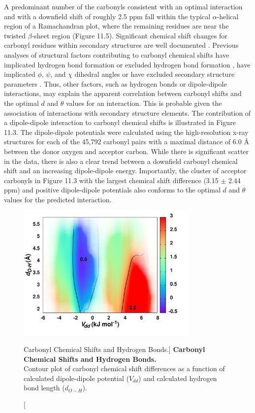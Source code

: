 \begin{doublespace}
A predominant number of the carbonyls consistent with an optimal \npistar{}
interaction and with a downfield shift of roughly 2.5 ppm fall within the
typical $\alpha$-helical region of a Ramachandran plot, where the remaining
residues are near the twisted $\beta$-sheet region (Figure 11.5). Significant
chemical shift changes for carbonyl residues within
secondary structures are well documented \cite{wang:protsci2002}.
Previous analyses of structural factors contributing to carbonyl \cnmr{}
chemical shifts have implicated hydrogen bond formation
\cite{dedios:sci1993,asakawa:jacs1992,wylie:jacs2007}
or excluded hydrogen bond formation
\cite{cisnetti:cpc2004,neal:jbnmr2003,markwick:jacs2004}, have
implicated $\phi$, $\psi$, and $\chi$ dihedral angles
\cite{neal:jbnmr2003} or have excluded secondary structure parameters
\cite{cisnetti:cpc2004,dedios:sci1993}. Thus, other factors,
such as hydrogen bonds or dipole-dipole interactions, may explain the apparent
correlation between carbonyl \cnmr{} shifts and the optimal $d$ and $\theta$
values for an \npistar{} interaction. This is probable given the association of
\npistar{} interactions with secondary structure elements. The contribution of
a dipole-dipole interaction to carbonyl \cnmr{} chemical shifts is illustrated
in Figure 11.3. The dipole-dipole potentials were calculated using the
high-resolution x-ray structures for each of the 45,792 carbonyl pairs with a
maximal distance of 6.0 \r{A} between the donor oxygen and acceptor carbon.
While there is significant scatter in the data, there is also a clear trend
between a downfield carbonyl \cnmr{} chemical shift and an increasing
dipole-dipole energy. Importantly, the cluster of acceptor carbonyls in
Figure 11.3 with the largest \cnmr{} chemical shift difference
(3.15 $\pm$ 2.44 ppm) and positive dipole-dipole potentials also conforms to
the optimal $d$ and $\theta$ values for the predicted \npistar{} interaction.
\end{doublespace}

\begin{figure}
\includegraphics[width=3.5in]{figs/npistar/06-hbonds.png}
\caption
      [Carbonyl \cnmr{} Chemical Shifts and Hydrogen Bonds.]{
  {\bf Carbonyl \cnmr{} Chemical Shifts and Hydrogen Bonds.}
  \\
  Contour plot of \cnmr{} carbonyl chemical shift differences as a function
  of calculated dipole-dipole potential ($V_{dd}$) and calculated hydrogen
  bond length ($d_{O-H}$).
}
\end{figure}

